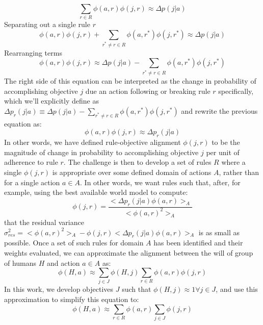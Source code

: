 \documentclass{article}
\begin{document}
\begin{equation}
     \sum\limits_{r\in R} \phi(a,r) \phi(j,r) \approx \Delta p(j|a) 
\end{equation}
Separating out a single rule $r$
\begin{equation}
     \phi(a,r) \phi(j,r) + \sum\limits_{r^*\neq r\in R} \phi(a,r^*) \phi(j,r^*) \approx \Delta p(j|a) 
\end{equation}
Rearranging terms
\begin{equation}
     \phi(a,r) \phi(j,r)\approx \Delta p(j|a) - \sum\limits_{r^*\neq r\in R} \phi(a,r^*) \phi(j,r^*)
\end{equation}
The right side of this equation can be interpreted as the change in probability of accomplishing objective $j$ due an action following or breaking rule $r$ specifically, which we'll explicitly define as $\Delta p_r(j|a) \equiv \Delta p(j|a) - \sum\limits_{r^*\neq r\in R} \phi(a,r^*) \phi(j,r^*)$ and rewrite the previous equation as:
\begin{equation}
     \phi(a,r) \phi(j,r)\approx \Delta p_r(j|a)
\end{equation}
In other words, we have defined rule-objective alignment $\phi(j,r)$ to be the magnitude of change in probability to accomplishing objective $j$ per unit of adherence to rule $r$. The challenge is then to develop a set of rules $R$ where a single $\phi(j,r)$ is appropriate over some defined domain of actions $A$, rather than for a single action $a\in A$. In other words, we want rules such that, after, for example, using the best available world model to compute:
\begin{equation}
    \phi(j,r) = \frac{<\Delta p_r(j|a)\phi(a,r)>_A}{<\phi(a,r)^2>_A}
\end{equation}
that the residual variance $\sigma^2_{res} = <\phi(a,r)^2>_A-\phi(j,r)<\Delta p_r(j|a)\phi(a,r)>_A$ is as small as possible. Once a set of such rules for domain $A$ has been identified and their weights evaluated, we can approximate the alignment between the will of group of humans $H$ and action $a\in A$ as:
\begin{equation}
    \phi(H,a) \approx \sum\limits_{j\in J}\phi(H,j) \sum\limits_{r\in R} \phi(a,r) \phi(j,r) 
\end{equation}
In this work, we develop objectives $J$ such that $\phi(H,j)\approx 1 \forall j\in J$, and use this approximation to simplify this equation to:
\begin{equation}
    \phi(H,a) \approx \sum\limits_{r\in R} \phi(a,r) \sum\limits_{j\in J} \phi(j,r) 
\end{equation}
\end{document}
